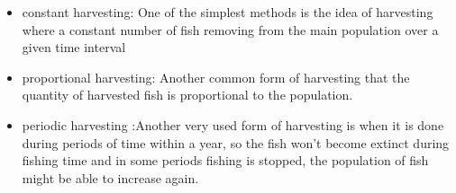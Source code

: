 \begin{itemize}
	\item constant harvesting: One of the simplest methods is the idea of harvesting where  a constant number of fish removing from the main population over a given time interval
	
	\item proportional harvesting: Another common form of harvesting that the quantity of harvested fish is proportional to the population. 
	
	\item periodic harvesting :Another very used form of harvesting is when it is done during periods of time within a year, so the fish won’t become extinct during fishing time and in some periods fishing is stopped, the population of fish might be able to increase again. 
\end{itemize}

